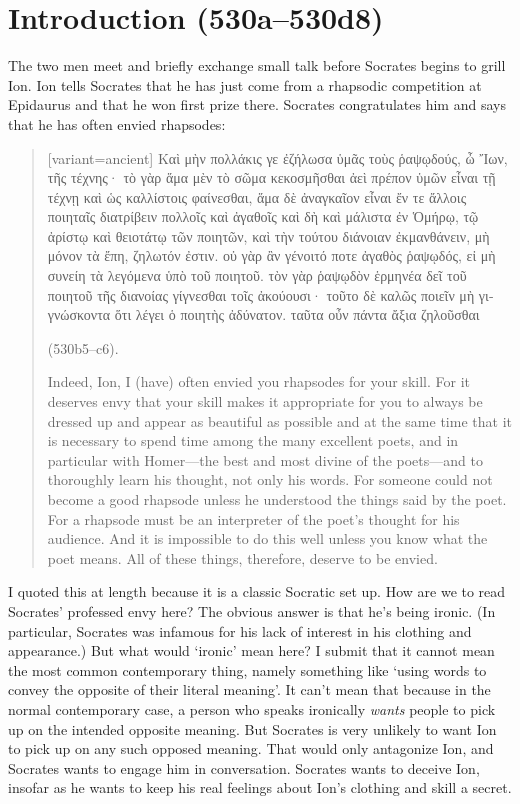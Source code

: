 \documentclass[11pt,letterpaper]{article}
\begin{document}
\section{Introduction (530a--530d8)}

The two men meet and briefly exchange small talk before Socrates begins to grill Ion. Ion tells Socrates that he has just come from a rhapsodic competition at Epidaurus and that he won first prize there. Socrates congratulates him and says that he has often envied rhapsodes: 

\begin{quote}
    \begin{greek}[variant=ancient]
    Καὶ μὴν πολλάκις γε ἐζήλωσα ὑμᾶς τοὺς ῥαψῳδούς, ὦ Ἴων, τῆς τέχνης· τὸ γὰρ ἅμα μὲν τὸ σῶμα κεκοσμῆσθαι ἀεὶ πρέπον ὑμῶν εἶναι τῇ τέχνῃ καὶ ὡς καλλίστοις φαίνεσθαι, ἅμα δὲ ἀναγκαῖον εἶναι ἔν τε ἄλλοις ποιηταῖς διατρίβειν πολλοῖς καὶ ἀγαθοῖς καὶ δὴ καὶ μάλιστα ἐν Ὁμήρῳ, τῷ ἀρίστῳ καὶ θειοτάτῳ τῶν ποιητῶν, καὶ τὴν τούτου διάνοιαν ἐκμανθάνειν, μὴ μόνον τὰ ἔπη, ζηλωτόν ἐστιν. οὐ γὰρ ἂν γένοιτό ποτε ἀγαθὸς ῥαψῳδός, εἰ μὴ συνείη τὰ λεγόμενα ὑπὸ τοῦ ποιητοῦ. τὸν γὰρ ῥαψῳδὸν ἑρμηνέα δεῖ τοῦ ποιητοῦ τῆς διανοίας γίγνεσθαι τοῖς ἀκούουσι· τοῦτο δὲ καλῶς ποιεῖν μὴ γιγνώσκοντα ὅτι λέγει ὁ ποιητὴς ἀδύνατον. ταῦτα οὖν πάντα ἄξια ζηλοῦσθαι
    \end{greek} (530b5--c6).

    Indeed, Ion, I (have) often envied you rhapsodes for your skill. For it deserves envy that your skill makes it appropriate for you to always be dressed up and appear as beautiful as possible and at the same time that it is necessary to spend time among the many excellent poets, and in particular with Homer---the best and most divine of the poets---and to thoroughly learn his thought, not only his words. For someone could not become a good rhapsode unless he understood the things said by the poet. For a rhapsode must be an interpreter of the poet's thought for his audience. And it is impossible to do this well unless you know what the poet means. All of these things, therefore, deserve to be envied.
\end{quote}

I quoted this at length because it is a classic Socratic set up. How are we to read Socrates' professed envy here? The obvious answer is that he's being ironic. (In particular, Socrates was infamous for his lack of interest in his clothing and appearance.) But what would `ironic' mean here? I submit that it cannot mean the most common contemporary thing, namely something like `using words to convey the opposite of their literal meaning'. It can't mean that because in the normal contemporary case, a person who speaks ironically \emph{wants} people to pick up on the intended opposite meaning. But Socrates is very unlikely to want Ion to pick up on any such opposed meaning. That would only antagonize Ion, and Socrates wants to engage him in conversation. Socrates wants to deceive Ion, insofar as he wants to keep his real feelings about Ion's clothing and skill a secret.
\end{document}
